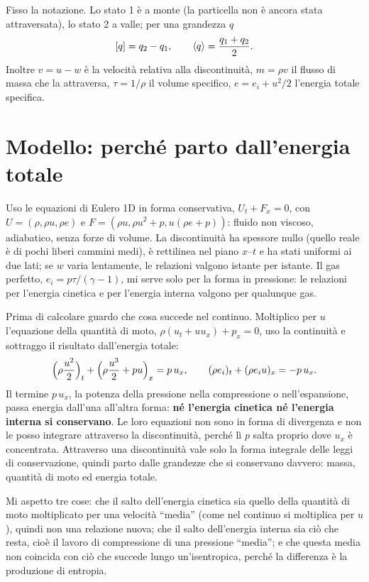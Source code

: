 Fisso la notazione. Lo stato 1 è a monte (la particella non è ancora stata attraversata), lo stato 2 a valle; per
una grandezza $q$
\begin{gather*}
  \left[q\right]=q_2-q_1 ,\qquad \left\langle q\right\rangle=\frac{q_1+q_2}{2}.
\end{gather*}
Inoltre $v=u-w$ è la velocità relativa alla discontinuità, $m=\rho v$ il flusso di massa che la attraversa,
$\tau=1/\rho$ il volume specifico, $e=e_i+u^2/2$ l'energia totale specifica.

\section*{Modello: perché parto dall'energia totale}
Uso le equazioni di Eulero 1D in forma conservativa, $U_t+F_x=0$, con $U=(\rho,\rho u,\rho e)$ e
$F=(\rho u,\rho u^2+p,u(\rho e+p))$: fluido non viscoso, adiabatico, senza forze di volume. La discontinuità ha
spessore nullo (quello reale è di pochi liberi cammini medi), è rettilinea nel piano $x$--$t$ e ha stati uniformi
ai due lati; se $w$ varia lentamente, le relazioni valgono istante per istante. Il gas perfetto,
$e_i=p\tau/(\gamma-1)$, mi serve solo per la forma in pressione: le relazioni per l'energia cinetica e per
l'energia interna valgono per qualunque gas.

Prima di calcolare guardo che cosa succede nel continuo. Moltiplico per $u$ l'equazione della quantità di moto,
$\rho(u_t+uu_x)+p_x=0$, uso la continuità e sottraggo il risultato dall'energia totale:
\begin{gather*}
  \Bigl(\rho\frac{u^2}{2}\Bigr)_t+\Bigl(\rho\frac{u^3}{2}+pu\Bigr)_x=p\,u_x ,\qquad
  (\rho e_i)_t+(\rho e_iu)_x=-p\,u_x .
\end{gather*}
Il termine $p\,u_x$, la potenza della pressione nella compressione o nell'espansione, passa energia dall'una
all'altra forma: \textbf{né l'energia cinetica né l'energia interna si conservano}. Le loro equazioni non sono in
forma di divergenza e non le posso integrare attraverso la discontinuità, perché lì $p$ salta proprio dove $u_x$ è
concentrata. Attraverso una discontinuità vale solo la forma integrale delle leggi di conservazione, quindi parto
dalle grandezze che si conservano davvero: massa, quantità di moto ed energia totale.

Mi aspetto tre cose: che il salto dell'energia cinetica sia quello della quantità di moto moltiplicato per una
velocità ``media'' (come nel continuo si moltiplica per $u$), quindi non una relazione nuova; che il salto
dell'energia interna sia ciò che resta, cioè il lavoro di compressione di una pressione ``media''; e che questa
media non coincida con ciò che succede lungo un'isentropica, perché la differenza è la produzione di entropia.

